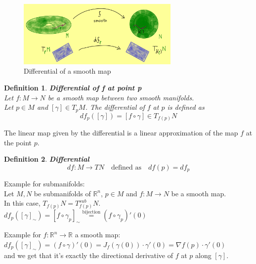 \documentclass[11pt]{book} %
\newtheorem{definition}{Definition}[section]
\begin{document}
\begin{figure}[H]
    \centering
    \includegraphics[width=0.7\textwidth]{Figs/differential_of_a_map_between_manifolds.jpeg}
    \caption{Differential of a smooth map}
\end{figure}

\begin{definition}{\textbf{Differential of f at point p}} \\
    Let \( f: M \to N \) be a smooth map between two smooth manifolds. \\
    Let \( p \in M \) and \( [\gamma] \in T_pM \). The differential of \( f \) at \( p \) is defined as \\
    \begin{equation*}
        df_p([\gamma]) = [f \circ \gamma] \in T_{f(p)}N
    \end{equation*}
\end{definition}

The linear map given by the differential is a linear approximation of the map \( f \) at the point \( p \). 

\begin{definition}{\textbf{Differential}} \\
    \begin{equation*}
        df : M \to TN \quad \text{defined as} \quad df(p) = df_p
    \end{equation*}
\end{definition}

\bigbreak

Example for submanifolds: \\
Let \( M , N \) be submanifolds of \( \mathbb{R}^n \), $p \in M$ and \( f: M \to N \) be a smooth map. \\
In this case, \(T_{f(p)}N = T_{f(p)}^{sub}N \). \\
$df_p ([\gamma]_{\sim}) = [f \circ \gamma_p]_{\sim} \stackrel{\text{bijection}}{=} (f \circ \gamma_p)'(0)$

\bigbreak

Example for $f : \mathbb{R}^n \to \mathbb{R}$ a smooth map: \\
$df_p([\gamma]_{\sim}) = (f \circ \gamma)'(0) = J_f(\gamma(0)) \cdot \gamma'(0) = \nabla f(p) \cdot \gamma'(0)$ \\
and we get that it's exactly the directional derivative of $f$ at $p$ along $[\gamma]$.
\end{document}
